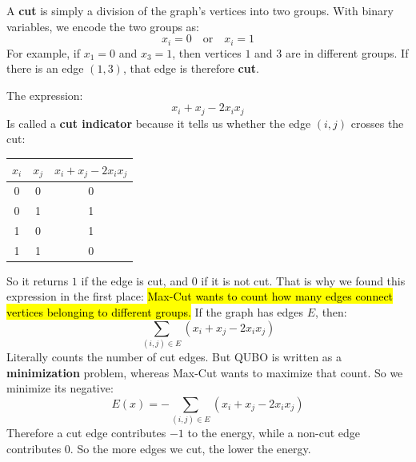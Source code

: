 \begin{deepeningbox}
    A \textbf{cut} is simply a division of the graph's vertices into two groups. With binary variables, we encode the two groups as:
    \begin{equation*}
        x_i = 0 \quad \text{or} \quad x_i = 1
    \end{equation*}
    For example, if $x_1 = 0$ and $x_3 = 1$, then vertices $1$ and $3$ are in different groups. If there is an edge $(1,3)$, that edge is therefore \textbf{cut}.

    \highspace
    The expression:
    \begin{equation*}
        x_i + x_j - 2 x_i x_j
    \end{equation*}
    Is called a \textbf{cut indicator} because it tells us whether the edge $(i,j)$ crosses the cut:
    \begin{center}
        \begin{tabular}{@{} c c c @{}}
            \toprule
            $x_i$ & $x_j$ & $x_i + x_j - 2 x_i x_j$ \\
            \midrule
            0 & 0 & 0 \\
            0 & 1 & 1 \\
            1 & 0 & 1 \\
            1 & 1 & 0 \\
            \bottomrule
        \end{tabular}
    \end{center}
    So it returns $1$ if the edge is cut, and $0$ if it is not cut. That is why we found this expression in the first place: \hl{Max-Cut wants to count how many edges connect vertices belonging to different groups.} If the graph has edges $E$, then:
    \begin{equation*}
        \sum_{(i,j) \in E} \left(x_i + x_j - 2 x_i x_j\right)
    \end{equation*}
    Literally counts the number of cut edges. But QUBO is written as a \textbf{minimization} problem, whereas Max-Cut wants to maximize that count. So we minimize its negative:
    \begin{equation*}
        E(x)=
        -\sum_{(i,j)\in E}
        \left(x_i+x_j-2x_ix_j\right)
    \end{equation*}
    Therefore a cut edge contributes $-1$ to the energy, while a non-cut edge contributes $0$. So the more edges we cut, the lower the energy.


\end{deepeningbox}
